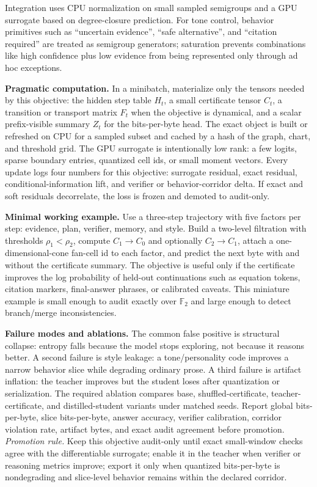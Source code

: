\documentclass[10pt]{article}
\newcommand{\FF}{\mathbb{F}}
\numberwithin{equation}{section}
\begin{document}
Integration uses CPU normalization on small sampled semigroups and a GPU surrogate based on degree-closure prediction. For tone control, behavior primitives such as ``uncertain evidence'', ``safe alternative'', and ``citation required'' are treated as semigroup generators; saturation prevents combinations like high confidence plus low evidence from being represented only through ad hoc exceptions.

\noindent\textbf{Pragmatic computation.} In a minibatch, materialize only the tensors needed by this objective: the hidden step table $H_t$, a small certificate tensor $C_t$, a transition or transport matrix $F_t$ when the objective is dynamical, and a scalar prefix-visible summary $Z_t$ for the bits-per-byte head. The exact object is built or refreshed on CPU for a sampled subset and cached by a hash of the graph, chart, and threshold grid. The GPU surrogate is intentionally low rank: a few logits, sparse boundary entries, quantized cell ids, or small moment vectors. Every update logs four numbers for this objective: surrogate residual, exact residual, conditional-information lift, and verifier or behavior-corridor delta. If exact and soft residuals decorrelate, the loss is frozen and demoted to audit-only.

\noindent\textbf{Minimal working example.} Use a three-step trajectory with five factors per step: evidence, plan, verifier, memory, and style. Build a two-level filtration with thresholds $\rho_1<\rho_2$, compute $C_1\to C_0$ and optionally $C_2\to C_1$, attach a one-dimensional-cone fan-cell id to each factor, and predict the next byte with and without the certificate summary. The objective is useful only if the certificate improves the log probability of held-out continuations such as equation tokens, citation markers, final-answer phrases, or calibrated caveats. This miniature example is small enough to audit exactly over $\FF_2$ and large enough to detect branch/merge inconsistencies.

\noindent\textbf{Failure modes and ablations.} The common false positive is structural collapse: entropy falls because the model stops exploring, not because it reasons better. A second failure is style leakage: a tone/personality code improves a narrow behavior slice while degrading ordinary prose. A third failure is artifact inflation: the teacher improves but the student loses after quantization or serialization. The required ablation compares base, shuffled-certificate, teacher-certificate, and distilled-student variants under matched seeds. Report global bits-per-byte, slice bits-per-byte, answer accuracy, verifier calibration, corridor violation rate, artifact bytes, and exact audit agreement before promotion.
\vfill
\noindent\emph{Promotion rule.} Keep this objective audit-only until exact small-window checks agree with the differentiable surrogate; enable it in the teacher when verifier or reasoning metrics improve; export it only when quantized bits-per-byte is nondegrading and slice-level behavior remains within the declared corridor.
\clearpage
\end{document}
